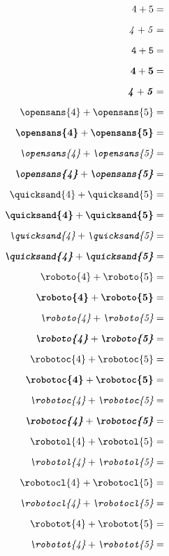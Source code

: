 \documentclass[a4paper,12pt]{article}
\begin{document}
\begin{multicols}{5}
\begin{align*}
\end{align*}
\begin{align*}
\mathrm{4}+\mathrm{5}&=\\[0.6em]
\mathit{4}+\mathit{5}&=\\[0.6em]
\mathtt{4}+\mathtt{5}&=\\[0.6em]
\mathbf{4}+\mathbf{5}&=\\[0.6em]
\textbf{\textit{4}}+\textbf{\textit{5}}&=\\[0.6em]
\textrm{\opensans{4}}+\textrm{\opensans{5}}&=\\[0.6em]
\textbf{\opensans{4}}+\textbf{\opensans{5}}&=\\[0.6em]
\textit{\opensans{4}}+\textit{\opensans{5}}&=\\[0.6em]
\textbf{\textit{\opensans{4}}}+\textbf{\textit{\opensans{5}}}&=\\[0.6em]
\textrm{\quicksand{4}}+\textrm{\quicksand{5}}&=\\[0.6em]
\textbf{\quicksand{4}}+\textbf{\quicksand{5}}&=\\[0.6em]
\textit{\quicksand{4}}+\textit{\quicksand{5}}&=\\[0.6em]
\textbf{\textit{\quicksand{4}}}+\textbf{\textit{\quicksand{5}}}&=\\[0.6em]
\textrm{\roboto{4}}+\textrm{\roboto{5}}&=\\[0.6em]
\textbf{\roboto{4}}+\textbf{\roboto{5}}&=\\[0.6em]
\textit{\roboto{4}}+\textit{\roboto{5}}&=\\[0.6em]
\textbf{\textit{\roboto{4}}}+\textbf{\textit{\roboto{5}}}&=\\[0.6em]
\textrm{\robotoc{4}}+\textrm{\robotoc{5}}&=\\[0.6em]
\textbf{\robotoc{4}}+\textbf{\robotoc{5}}&=\\[0.6em]
\textit{\robotoc{4}}+\textit{\robotoc{5}}&=\\[0.6em]
\textbf{\textit{\robotoc{4}}}+\textbf{\textit{\robotoc{5}}}&=\\[0.6em]
\textrm{\robotol{4}}+\textrm{\robotol{5}}&=\\[0.6em]
\textit{\robotol{4}}+\textit{\robotol{5}}&=\\[0.6em]
\textrm{\robotocl{4}}+\textrm{\robotocl{5}}&=\\[0.6em]
\textit{\robotocl{4}}+\textit{\robotocl{5}}&=\\[0.6em]
\textrm{\robotot{4}}+\textrm{\robotot{5}}&=\\[0.6em]
\textit{\robotot{4}}+\textit{\robotot{5}}&=\\[0.6em]

\end{align*}
\end{multicols}
\end{document}
